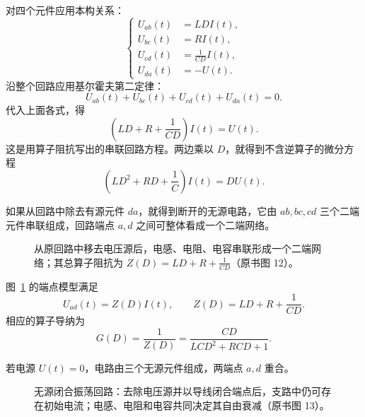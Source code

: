 对四个元件应用本构关系：
\begin{equation}
 \left\{
 \begin{aligned}
  U_{ab}(t)&=LDI(t),\\
  U_{bc}(t)&=RI(t),\\
  U_{cd}(t)&=\frac1{CD}I(t),\\
  U_{da}(t)&=-U(t).
 \end{aligned}
 \right.
 \label{eq:ch2-13-oscillator-element-voltages}
\end{equation}
沿整个回路应用基尔霍夫第二定律：
\begin{equation}
 U_{ab}(t)+U_{bc}(t)+U_{cd}(t)+U_{da}(t)=0.
 \label{eq:ch2-13-oscillator-kvl}
\end{equation}
代入上面各式，得
\begin{equation}
 \left(LD+R+\frac1{CD}\right)I(t)=U(t).
 \label{eq:ch2-13-oscillator-impedance}
\end{equation}
这是用算子阻抗写出的串联回路方程。两边乘以 \(D\)，就得到不含逆算子的微分方程
\begin{equation}
 \left(LD^2+RD+\frac1C\right)I(t)=DU(t).
 \label{eq:ch2-13-oscillator-differential}
\end{equation}

如果从回路中除去有源元件 \(da\)，就得到断开的无源电路，它由 \(ab,bc,cd\) 三个二端元件串联组成，回路端点 \(a,d\) 之间可整体看成一个二端网络。

\begin{figure}[H]
 \centering
 \resizebox{0.56\textwidth}{!}{}
 \caption{从原回路中移去电压源后，电感、电阻、电容串联形成一个二端网络；其总算子阻抗为 \(Z(D)=LD+R+\frac1{CD}\)（原书图 12）。}
 \label{fig:ch2-13-disconnected-circuit}
\end{figure}

图~\ref{fig:ch2-13-disconnected-circuit} 的端点模型满足
\begin{equation}
 U_{ad}(t)=Z(D)I(t),
 \qquad
 Z(D)=LD+R+\frac1{CD}.
 \label{eq:ch2-13-series-impedance}
\end{equation}
相应的算子导纳为
\begin{equation}
 G(D)=\frac1{Z(D)}
 =\frac{CD}{LCD^2+RCD+1}.
 \label{eq:ch2-13-series-admittance}
\end{equation}

若电源 \(U(t)=0\)，电路由三个无源元件组成，两端点 \(a,d\) 重合。

\begin{figure}[H]
 \centering
 \resizebox{0.45\textwidth}{!}{}
 \caption{无源闭合振荡回路：去除电压源并以导线闭合端点后，支路中仍可存在初始电流；电感、电阻和电容共同决定其自由衰减（原书图 13）。}
 \label{fig:ch2-13-passive-loop}
\end{figure}

